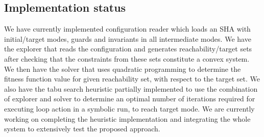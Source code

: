 \subsection{Implementation status}
We have currently implemented configuration reader which loads an SHA with initial/target modes, guards and invariants in all intermediate modes. We have the explorer that reads the configuration and generates reachability/target sets after checking that the constraints from these sets constitute a convex system. We then have the solver that uses quadratic programming to determine the fitness function value for given reachability set, with respect to the target set. We also have the tabu search heuristic partially implemented to use the combination of explorer and solver to determine an optimal number of iterations required for executing loop action in a symbolic run, to reach target mode. We are currently working on completing the heuristic implementation and integrating the whole system to extensively test the proposed approach.   
